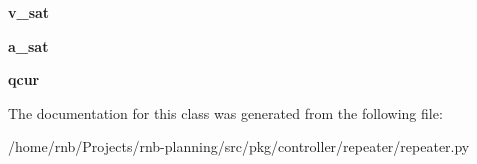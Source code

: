 \begin{DoxyCompactItemize}
\item 
\mbox{\label{classrnb-planning_1_1src_1_1pkg_1_1controller_1_1repeater_1_1repeater_1_1_repeater_ada037f9289417a5410ea6939a91ac51c}} 
{\bfseries v\+\_\+sat}
\item 
\mbox{\label{classrnb-planning_1_1src_1_1pkg_1_1controller_1_1repeater_1_1repeater_1_1_repeater_a7533cf610cb9538233375a8cb6cd1c9c}} 
{\bfseries a\+\_\+sat}
\item 
\mbox{\label{classrnb-planning_1_1src_1_1pkg_1_1controller_1_1repeater_1_1repeater_1_1_repeater_a5e6a709e8f534bf411019d8af0cf449e}} 
{\bfseries qcur}
\end{DoxyCompactItemize}


The documentation for this class was generated from the following file\+:\begin{DoxyCompactItemize}
\item 
/home/rnb/\+Projects/rnb-\/planning/src/pkg/controller/repeater/repeater.\+py\end{DoxyCompactItemize}
